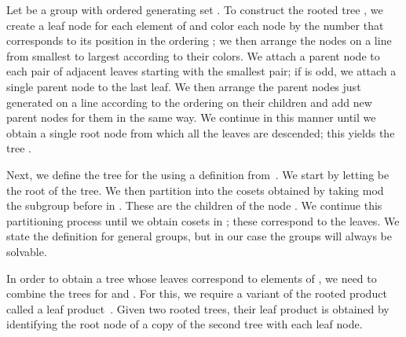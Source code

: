 \begin{definition}
  \label{defn:TP}
  Let  be a group with ordered generating set .  To construct the rooted tree , we create a leaf node for each element of  and color each node by the number that corresponds to its position in the ordering ; we then arrange the nodes on a line from smallest to largest according to their colors.  We attach a parent node to each pair of adjacent leaves starting with the smallest pair; if  is odd, we attach a single parent node to the last leaf.  We then arrange the parent nodes just generated on a line according to the ordering on their children and add new parent nodes for them in the same way.  We continue in this manner until we obtain a single root node from which all the leaves are descended; this yields the tree .
\end{definition}

Next, we define the tree for the  using a definition from~\cite{rosenbaum2013c}.  We start by letting  be the root of the tree.  We then partition  into the cosets obtained by taking  mod the subgroup before  in .  These are the children of the node .  We continue this partitioning process until we obtain cosets in ; these correspond to the leaves.  We state the definition for general groups, but in our case the groups will always be solvable.


In order to obtain a tree whose leaves correspond to elements of , we need to combine the trees for  and .  For this, we require a variant of the rooted product~\cite{godsil1978a} called a leaf product~\cite{rosenbaum2013c}.  Given two rooted trees, their leaf product is obtained by identifying the root node of a copy of the second tree with each leaf node.

